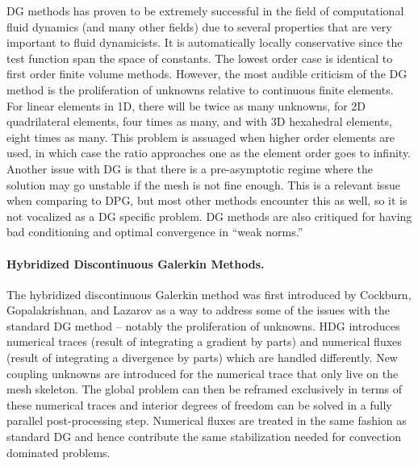 \documentclass[Dissertation.tex]{subfiles}
\begin{document}
DG methods has proven to be extremely successful in the field of computational fluid dynamics (and many other fields) due
to several properties that are very important to fluid dynamicists.
It is automatically locally conservative since the test function span the space of constants.
The lowest order case is identical to first order finite volume methods.
However, the most audible criticism of the DG method is the proliferation of unknowns relative to continuous finite elements.
For linear elements in 1D, there will be twice as many unknowns, for 2D quadrilateral elements, four times as many, and with 3D hexahedral elements, eight
times as many.
This problem is assuaged when higher order elements are used, in which case the ratio approaches one as the element order goes to infinity.
Another issue with DG is that there is a pre-asymptotic regime where the solution may go unstable if the mesh is not fine enough.
This is a relevant issue when comparing to DPG, but most other methods encounter this as well, so it is not vocalized as a DG specific problem.
DG methods are also critiqued for having bad conditioning and optimal convergence in ``weak norms.''

\paragraph*{Hybridized Discontinuous Galerkin Methods.}
The hybridized discontinuous Galerkin method was first introduced by Cockburn, Gopalakrishnan, and Lazarov\cite{HDG}
as a way to address some of the issues with the standard DG method
-- notably the proliferation of unknowns.
HDG introduces numerical traces (result of integrating a gradient by parts) and numerical fluxes (result of integrating a divergence by parts)
which are handled differently.
New coupling unknowns are introduced for the numerical trace that only live on the mesh skeleton.
The global problem can then be reframed exclusively in terms of these numerical traces and interior degrees of freedom
can be solved in a fully parallel post-processing step.
Numerical fluxes are treated in the same fashion as standard DG and hence contribute the same stabilization needed for convection dominated problems.
\end{document}
